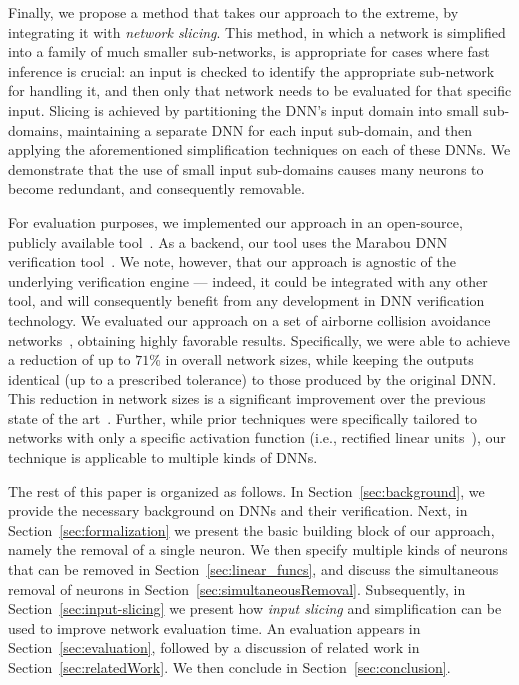 \documentclass[10pt, conference, twocolumn, compsocconf]{IEEEtran}
\theoremstyle{remark}
\begin{document}


Finally, we propose a method that takes our approach to the extreme,
by integrating it with \emph{network slicing}. This method, in which a
network is simplified into a family of much smaller sub-networks, is
appropriate for cases where fast inference is crucial: an input is
checked to identify the appropriate sub-network for handling it, and
then only that network needs to be evaluated for that specific input.
Slicing is achieved by partitioning the DNN's input
domain into small sub-domains, maintaining a separate DNN for each
input sub-domain, and then applying the aforementioned simplification
techniques on each of these DNNs. We demonstrate that the use of 
small input sub-domains causes many neurons to become redundant, and
consequently removable.


For evaluation purposes, we implemented our approach in an
open-source, publicly available tool~\cite{ourCode}. As a
backend, our tool uses the Marabou DNN verification
tool~\cite{Marabou2019}. We note, however, that our approach is
agnostic of the underlying verification engine --- indeed, it could be
integrated with any other tool, and will consequently benefit from any
development in DNN verification technology.  We evaluated our approach
on a set of airborne collision avoidance networks~\cite{JuLoBrOwKo16},
obtaining highly favorable results. Specifically, we were able to
achieve a reduction of up to $71$\% in overall network sizes, while
keeping the outputs identical (up to a prescribed tolerance) to those
produced by the original DNN.  This reduction in network sizes is a
significant improvement over the previous state of the
art~\cite{GoFeMaBaKa20}. Further, while prior techniques were
specifically tailored to networks with only a specific activation
function (i.e., rectified linear units~\cite{GoFeMaBaKa20}), our
technique is applicable to multiple kinds of DNNs.


The rest of this paper is organized as follows. In
Section~\ref{sec:background}, we provide the necessary background on
DNNs and their verification. Next, in Section~\ref{sec:formalization}
we present the basic building block of our approach, namely the
removal of a single neuron. We then specify multiple kinds of neurons
that can be removed in Section~\ref{sec:linear_funcs}, and discuss the
simultaneous removal of neurons in
Section~\ref{sec:simultaneousRemoval}.  Subsequently, in
Section~\ref{sec:input-slicing} we present how \emph{input slicing}
and simplification can be used to improve network evaluation time.  An
evaluation appears in Section~\ref{sec:evaluation}, followed by a
discussion of related work in Section~\ref{sec:relatedWork}. We then
conclude in Section~\ref{sec:conclusion}.
\end{document}

